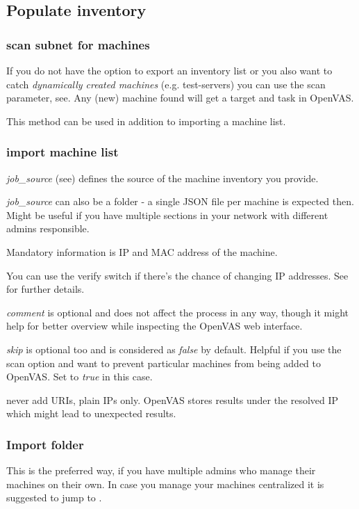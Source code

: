 \newpage\breakpoint\subsection{Populate inventory}\label{sec:inventory}
\breakpoint\subsubsection*{scan subnet for machines}\label{sec:scansubnet}
If you do not have the option to export an inventory list or you also want to catch \emph{dynamically created machines} (e.g. test-servers) you can use the scan parameter, see.
Any (new) machine found will get a target and task in OpenVAS.

\hint This method can be used in addition to importing a machine list.

\breakpoint\subsubsection*{import machine list}\label{sec:jobimport}
\textit{job\_source} (see) defines the source of the machine inventory you provide. 

\textit{job\_source} can also be a folder - a single JSON file per machine is expected then. Might be useful if you have multiple sections in your network with different admins responsible.

Mandatory information is IP and MAC address of the machine.

\hint You can use the verify switch if there's the chance of changing IP addresses. See for further details.

\emph{comment} is optional and does not affect the process in any way, though it might help for better overview while inspecting the OpenVAS web interface.

\emph{skip} is optional too and is considered as \emph{false} by default. Helpful if you use the scan option and want to prevent particular machines from being added to OpenVAS. Set to \emph{true} in this case.

\label{sec:plainipsonly}\warn never add URIs, plain IPs only. OpenVAS stores results under the resolved IP which might lead to unexpected results.


\breakpoint\subsubsection*{Import folder}\label{sec:jobfileimport}
This is the preferred way, if you have multiple admins who manage their machines on their own. In case you manage your machines centralized it is suggested to jump to .

